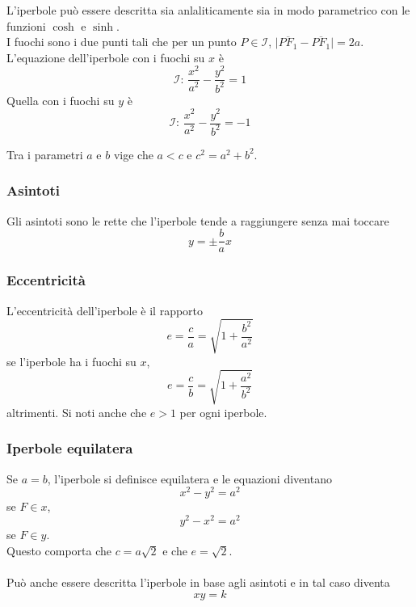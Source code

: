 L'iperbole può essere descritta sia anlaliticamente sia in modo parametrico con le funzioni $\cosh$ e
$\sinh$.\\
I fuochi sono i due punti tali che per un punto $P\in\mathscr{I}$, 
$\lvert \overline{PF_1}-\overline{PF_1}\rvert=2a$.\\
L'equazione dell'iperbole con i fuochi su $x$ è
\begin{equation*}
\mathscr{I}:\,\frac{x^2}{a^2}-\frac{y^2}{b^2}=1
\end{equation*}
Quella con i fuochi su $y$ è
\begin{equation*}
\mathscr{I}:\,\frac{x^2}{a^2}-\frac{y^2}{b^2}=-1
\end{equation*}

Tra i parametri $a$ e $b$ vige che $a < c$ e $c^2 = a^2+b^2$.

\subsubsection{Asintoti}
Gli asintoti sono le rette che l'iperbole tende a raggiungere senza mai toccare
\begin{equation*}
y=\pm\frac{b}{a}x
\end{equation*}

	\subsubsection{Eccentricità}
L'eccentricità dell'iperbole è il rapporto
\begin{equation*}
e=\frac{c}{a}=\sqrt{1+\frac{b^2}{a^2}}
\end{equation*}
se l'iperbole ha i fuochi su $x$,
\begin{equation*}
e = \frac{c}{b}=\sqrt{1+\frac{a^2}{b^2}}
\end{equation*}
altrimenti. Si noti anche che $e > 1$ per ogni iperbole.

\subsubsection{Iperbole equilatera}
Se $a=b$, l'iperbole si definisce equilatera e le equazioni diventano 
\begin{equation*}
x^2-y^2=a^2
\end{equation*}
se $F\in x$,
\begin{equation*}
y^2-x^2=a^2
\end{equation*}
se $F\in y$.\\
Questo comporta che $c = a\sqrt{2}$ e che $e=\sqrt{2}$.\\\\
Può anche essere descritta l'iperbole in base agli asintoti e in tal caso diventa
\begin{equation*}
xy=k
\end{equation*}

